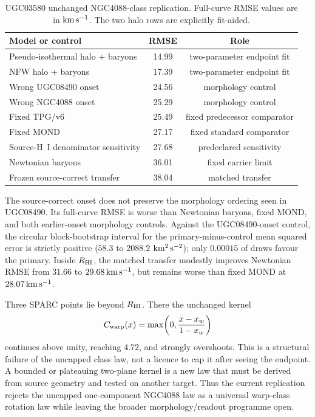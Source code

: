 \documentclass[11pt]{article}
\begin{document}
\begin{table}[H]
\centering
\caption{UGC03580 unchanged NGC4088-class replication.  Full-curve RMSE values
are in \({\rm km\,s^{-1}}\).  The two halo rows are explicitly fit-aided.}
\small
\begin{tabular}{lcc}
\toprule
Model or control & RMSE & Role\\
\midrule
Pseudo-isothermal halo + baryons & 14.99 & two-parameter endpoint fit\\
NFW halo + baryons & 17.39 & two-parameter endpoint fit\\
Wrong UGC08490 onset & 24.56 & morphology control\\
Wrong NGC4088 onset & 25.29 & morphology control\\
Fixed TPG/v6 & 25.49 & fixed predecessor comparator\\
Fixed MOND & 27.17 & fixed standard comparator\\
Source-H~I denominator sensitivity & 27.68 & predeclared sensitivity\\
Newtonian baryons & 36.01 & fixed carrier limit\\
Frozen source-correct transfer & 38.04 & matched transfer\\
\bottomrule
\end{tabular}
\end{table}

The source-correct onset does not preserve the morphology ordering seen in
UGC08490.  Its full-curve RMSE is worse than Newtonian baryons, fixed MOND, and
both earlier-onset morphology controls.  Against the UGC08490-onset control,
the circular block-bootstrap interval for the primary-minus-control mean
squared error is strictly positive (\(58.3\) to \(2088.2\)
\({\rm km^2\,s^{-2}}\)); only \(0.00015\) of draws favour the primary.
Inside \(R_{\rm HI}\), the matched transfer modestly improves Newtonian RMSE
from \(31.66\) to \(29.68\,{\rm km\,s^{-1}}\), but remains worse than fixed
MOND at \(28.07\,{\rm km\,s^{-1}}\).

Three SPARC points lie beyond \(R_{\rm HI}\).  There the unchanged kernel
\[
C_{\rm warp}(x)=\max\!\left(0,\frac{x-x_w}{1-x_w}\right)
\]
continues above unity, reaching \(4.72\), and strongly overshoots.  This is a
structural failure of the uncapped class law, not a licence to cap it after
seeing the endpoint.  A bounded or plateauing two-plane kernel is a new law
that must be derived from source geometry and tested on another target.  Thus
the current replication rejects the uncapped one-component NGC4088 law as a
universal warp-class rotation law while leaving the broader morphology/readout
programme open.
\end{document}
